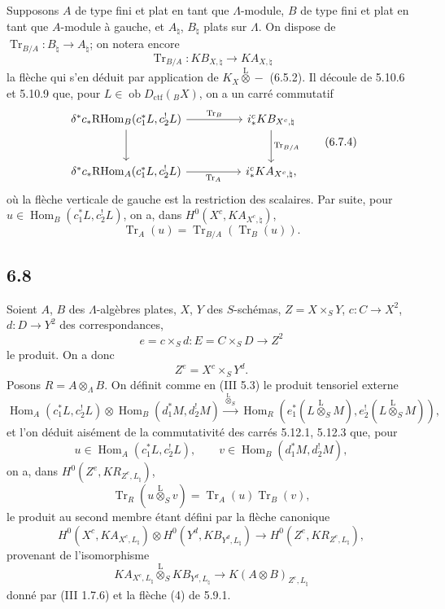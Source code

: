 \documentclass[11pt]{article}
\DeclareMathOperator{\Hom}{Hom}
\providecommand{\RHom}{\mathrm{RHom}}
\providecommand{\Tr}{\operatorname{Tr}}
\providecommand{\Tr}{\operatorname{Tr}}
\providecommand{\lten}{\overset{\mathrm L}{\otimes}}
\providecommand{\Ob}{\operatorname{ob}}
\providecommand{\Tr}{\operatorname{Tr}}
\providecommand{\RHom}{\mathrm{RHom}}
\providecommand{\Hom}{\operatorname{Hom}}
\providecommand{\lten}{\overset{\mathrm L}{\otimes}}
\providecommand{\RHom}{\mathrm R\mathcal{H}om}
\providecommand{\lten}{\overset{\mathrm L}{\otimes}}
\providecommand{\Ob}{\operatorname{ob}}
\providecommand{\Tr}{\operatorname{Tr}}
\providecommand{\lten}{\overset{\mathrm L}{\otimes}}
\providecommand{\lten}{\overset{\mathrm L}{\otimes}}
\providecommand{\Ob}{\operatorname{Ob}}
\providecommand{\lten}{\overset{\mathrm L}{\otimes}}
\providecommand{\RHom}{\mathrm{RHom}}
\providecommand{\Hom}{\operatorname{Hom}}
\providecommand{\Tr}{\operatorname{Tr}}
\providecommand{\Ob}{\operatorname{ob}}
\providecommand{\Ob}{\operatorname{Ob}}
\providecommand{\lten}{\overset{\mathrm L}{\otimes}}
\begin{document}
Supposons $A$ de type fini et plat en tant que $\Lambda$-module, $B$ de type fini et plat en tant que $A$-module à gauche, et $A_{\natural}$, $B_{\natural}$ plats sur $\Lambda$. On dispose de $\Tr_{B/A}:B_{\natural}\to A_{\natural}$; on notera encore
\begin{equation}
\Tr_{B/A}:KB_{X,\natural}\longrightarrow KA_{X,\natural}
\tag{6.7.3}
\end{equation}
la flèche qui s'en déduit par application de $K_X\lten -$ (6.5.2). Il découle de 5.10.6 et 5.10.9 que, pour $L\in\Ob D_{\mathrm{ctf}}({}_BX)$, on a un carré commutatif
\begin{equation}
\begin{tikzcd}[column sep=huge,row sep=large]
\delta^*c_*\RHom_B(c_1^*L,c_2^!L) \arrow[r,"\Tr_B"] \arrow[d]
& i_*^cKB_{X^c,\natural} \arrow[d,"\Tr_{B/A}"]\\
\delta^*c_*\RHom_A(c_1^*L,c_2^!L) \arrow[r,"\Tr_A"']
& i_*^cKA_{X^c,\natural},
\end{tikzcd}
\tag{6.7.4}
\end{equation}
où la flèche verticale de gauche est la restriction des scalaires. Par suite, pour $u\in\Hom_B(c_1^*L,c_2^!L)$, on a, dans $H^0(X^c,KA_{X^c,\natural})$,
\begin{equation}
\Tr_A(u)=\Tr_{B/A}(\Tr_B(u)).
\tag{6.7.5}
\end{equation}

\subsection*{6.8}
Soient $A$, $B$ des $\Lambda$-algèbres plates, $X$, $Y$ des $S$-schémas, $Z=X\times_SY$, $c:C\to X^2$, $d:D\to Y^2$ des correspondances,
\[
e=c\times_Sd:E=C\times_SD\longrightarrow Z^2
\]
le produit. On a donc
\[
Z^e=X^c\times_SY^d.
\]
Posons $R=A\otimes_{\Lambda}B$. On définit comme en (III 5.3) le produit tensoriel externe
\begin{equation}
\Hom_A(c_1^*L,c_2^!L)\otimes \Hom_B(d_1^*M,d_2^!M)
\xrightarrow{\ \lten_S\ }
\Hom_R(e_1^*(L\lten_SM),e_2^!(L\lten_SM)),
\tag{6.8.1}
\end{equation}
et l'on déduit aisément de la commutativité des carrés 5.12.1, 5.12.3 que, pour
\[
u\in\Hom_A(c_1^*L,c_2^!L),\qquad v\in\Hom_B(d_1^*M,d_2^!M),
\]
on a, dans $H^0(Z^e,KR_{Z^e,L_{\natural}})$,
\begin{equation}
\Tr_R(u\lten_Sv)=\Tr_A(u)\Tr_B(v),
\tag{6.8.2}
\end{equation}
le produit au second membre étant défini par la flèche canonique
\begin{equation}
H^0(X^c,KA_{X^c,L_{\natural}})\otimes
H^0(Y^d,KB_{Y^d,L_{\natural}})
\longrightarrow
H^0(Z^e,KR_{Z^e,L_{\natural}}),
\tag{6.8.3}
\end{equation}
provenant de l'isomorphisme
\[
KA_{X^c,L_{\natural}}\lten_S KB_{Y^d,L_{\natural}}\longrightarrow K(A\otimes B)_{Z^e,L_{\natural}}
\]
donné par (III 1.7.6) et la flèche (4) de 5.9.1.
\end{document}
